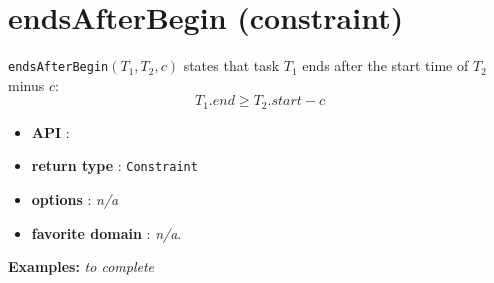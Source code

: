 \section{endsAfterBegin (constraint)}\label{endsafterbegin:endsafterbeginconstraint}\hypertarget{endsafterbegin:endsafterbeginconstraint}{}

\begin{notedef}
\texttt{endsAfterBegin}$(T_1,T_2,c)$ states that task $T_1$ ends after the start time of $T_2$ minus $c$:
  $$T_{1}.end \ge T_{2}.start - c$$
\end{notedef}

\begin{itemize}
	\item \textbf{API} :
	\item \textbf{return type} : \texttt{Constraint}
	\item \textbf{options} : \emph{n/a}
	\item \textbf{favorite domain} : \emph{n/a}.
\end{itemize}

\textbf{Examples:}
%
\emph{to complete}
